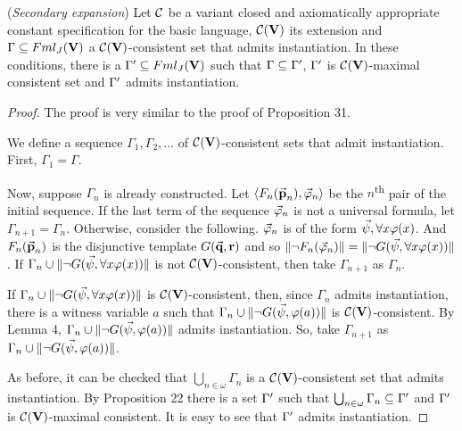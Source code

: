 \begin{pro}(\textit{Secondary expansion}) Let $\mathcal{C}$ be a variant closed and axiomatically appropriate constant specification for the basic language, $\mathcal{C}(\textbf{V})$ its extension and $\Gamma \subseteq Fml_{J}(\textbf{V})$ a $\mathcal{C}(\textbf{V})$-consistent set that admits instantiation. In these conditions, there is a $\Gamma^{\prime} \subseteq Fml_{J}(\textbf{V})$ such that $\Gamma \subseteq \Gamma^{\prime}$, $\Gamma^{\prime}$ is $\mathcal{C}(\textbf{V})$-maximal consistent set and $\Gamma^{\prime}$ admits instantiation.  
\end{pro}

\begin{proof}
	The proof is very similar to the proof of Proposition 31.
	
	\qquad We define a sequence $\Gamma_{1},\Gamma_{2}, \dots$ of $\mathcal{C}(\textbf{V})$-consistent sets that admit instantiation. First,     $\Gamma_{1} = \Gamma$.
	
	\qquad Now, suppose $\Gamma_{n}$ is already constructed. Let $\langle F_{n}(\vec{\textbf{p}}_{n}), \vec{\varphi}_{n} \rangle$ be the $n$\textsuperscript{th} pair of the initial sequence. If the last term of the sequence $\vec{\varphi}_{n}$ is not a universal formula, let $\Gamma_{n+1} = \Gamma_{n}$. Otherwise, consider the following. $\vec{\varphi}_{n}$ is of the form $\vec{\psi}, \forall x \varphi (x)$. And $F_{n}(\vec{\textbf{p}}_{n})$ is the disjunctive template $G(\vec{\textbf{q}},\textbf{r})$ and so  $\Arrowvert \neg F_{n}( \vec{\varphi}_{n}) \Arrowvert = \Arrowvert \neg G(\vec{\psi}, \forall x \varphi (x)) \Arrowvert$. If $\Gamma_{n}\cup \Arrowvert \neg G(\vec{\psi}, \forall x \varphi (x)) \Arrowvert$ is not $\mathcal{C}(\textbf{V})$-consistent, then take $\Gamma_{n+1}$ as $\Gamma_{n}$.
	
	\qquad If $\Gamma_{n}\cup \Arrowvert \neg G(\vec{\psi}, \forall x \varphi (x)) \Arrowvert$ is $\mathcal{C}(\textbf{V})$-consistent, then, since $\Gamma_{n}$ admits instantiation, there is a witness variable $a$ such that $\Gamma_{n}\cup \Arrowvert \neg G(\vec{\psi}, \varphi (a)) \Arrowvert$ is $\mathcal{C}(\textbf{V})$-consistent. By Lemma 4,  $\Gamma_{n}\cup \Arrowvert \neg G(\vec{\psi}, \varphi (a)) \Arrowvert$ admits instantiation. So, take $\Gamma_{n+1}$ as $\Gamma_{n}\cup \Arrowvert \neg G(\vec{\psi}, \varphi (a)) \Arrowvert$.
	
	\qquad As before, it can be checked that $\bigcup_{n\in \omega}\Gamma _{n}$ is a  $\mathcal{C}(\textbf{V})$-consistent set that admits instantiation. By Proposition 22 there is a set $\Gamma^{\prime}$ such that  $\bigcup_{n\in \omega} \Gamma_{n} \subseteq\Gamma^{\prime}$ and $\Gamma^{\prime}$ is $\mathcal{C}(\textbf{V})$-maximal consistent. It is easy to see that  $\Gamma^{\prime}$  admits instantiation. 
\end{proof}


